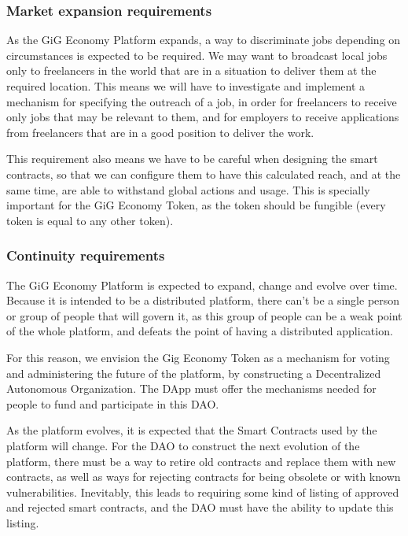 \documentclass{article}
\begin{document}
\subsubsection{Market expansion requirements}

As the GiG Economy Platform expands, a way to discriminate jobs depending on circumstances is expected to be required. We may want to broadcast local jobs only to freelancers in the world that are in a situation to deliver them at the required location. This means we will have to investigate and implement a mechanism for specifying the outreach of a job, in order for freelancers to receive only jobs that may be relevant to them, and for employers to receive applications from freelancers that are in a good position to deliver the work.

This requirement also means we have to be careful when designing the smart contracts, so that we can configure them to have this calculated reach, and at the same time, are able to withstand global actions and usage. This is specially important for the GiG Economy Token, as the token should be fungible (every token is equal to any other token).

\subsubsection{Continuity requirements}

The GiG Economy Platform is expected to expand, change and evolve over time. Because it is intended to be a distributed platform, there can't be a single person or group of people that will govern it, as this group of people can be a weak point of the whole platform, and defeats the point of having a distributed application.

For this reason, we envision the Gig Economy Token as a mechanism for voting and administering the future of the platform, by constructing a Decentralized Autonomous Organization. The DApp must offer the mechanisms needed for people to fund and participate in this DAO.

As the platform evolves, it is expected that the Smart Contracts used by the platform will change. For the DAO to construct the next evolution of the platform, there must be a way to retire old contracts and replace them with new contracts, as well as ways for rejecting contracts for being obsolete or with known vulnerabilities. Inevitably, this leads to requiring some kind of listing of approved and rejected smart contracts, and the DAO must have the ability to update this listing.
\end{document}
